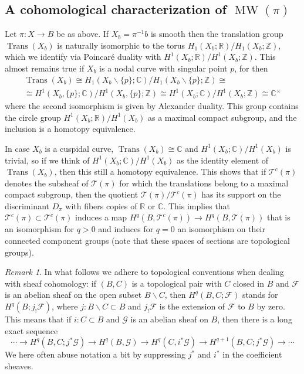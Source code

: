 \documentclass[10pt,letterpaper]{amsart}
\numberwithin{equation}{section}
\def\CC{{\mathbb C}}
\def\RR{{\mathbb R}}
\def\ZZ{{\mathbb Z}}
\def\ssm{\smallsetminus}
\def\Fscr{{\mathscr F}}
\def\Gscr{{\mathscr G}}
\def\Tscr{{\mathscr T}}
\newcommand\MW{\operatorname{MW}}
\newcommand\Trans{\operatorname{Trans}}
\theoremstyle{remark}
\newtheorem{remark}[theorem]{Remark}
\begin{document}
\subsection{A cohomological characterization of $\MW(\pi)$} 
Let $\pi: X\to B$ be as above. 
If $X_b=\pi^{-1}b$ is smooth then the translation group  $\Trans (X_b)$ is naturally isomorphic to 
the torus $H_1(X_b; \RR)/H_1(X_b; \ZZ)$, which we identify via Poincar\'e duality with 
$H^1(X_b; \RR)/H^1(X_b; \ZZ)$. This almost remains true if $X_b$ is a nodal curve with singular point $p$, for then 
\begin{multline*}
\Trans (X_b)\cong H_1(X_b\ssm \{p\}; \CC)/H_1(X_b\ssm \{p\}; \ZZ)\cong\\\cong  
H^1(X_b,\{p\}; \CC)/H^1(X_b, \{p\}; \ZZ) \cong H^1(X_b; \CC)/H^1(X_b; \ZZ)\cong\CC^\times
\end{multline*}
where the second isomorphism is given by Alexander duality.  This group contains the circle group $H^1(X_b; \RR)/H^1(X_b)$ as a maximal compact subgroup, and the inclusion is a homotopy equivalence. 

In case $X_b$ is a cuspidal curve, $\Trans (X_b)\cong \CC$ and $H^1(X_b; \CC)/H^1(X_b)$ is trivial, so if we think of $H^1(X_b; \CC)/H^1(X_b)$ as the identity element of $\Trans(X_b)$, then this still a homotopy equivalence.
This shows that if  $ \Tscr^c(\pi)$ denotes
the subsheaf  of  $\Tscr(\pi)$ for which the translations belong to a maximal compact subgroup, then  the quotient $\Tscr(\pi)/\Tscr^c(\pi)$ has its support on the discriminant $D_\pi$ with fibers copies of $\RR$ or $\CC$. This implies that $\Tscr^c(\pi)\subset \Tscr^c(\pi)$ induces a map $H^q(B,\Tscr^c(\pi))\to H^q(B,\Tscr(\pi))$ that is an  isomorphism for $q>0$  and  
induces for $q=0$ an isomorphism on  their  connected component groups (note that these spaces of sections are topological groups).

\begin{remark}\label{rem:sheafconvention}
In what follows we adhere to topological conventions when dealing with sheaf cohomology:  if  $(B, C)$ is a topological pair   with $C$ closed in $B$ and $\Fscr$ is an abelian  sheaf on the open subset $B\ssm C$, then $H^q(B,C; \Fscr)$  stands for $H^q(B; j_!\Fscr)$, where $j:B\ssm C\subset B$ and $ j_!\Fscr$ is the extension of $\Fscr$ to $B$ by zero. This means that if $i: C\subset B$ and 
$\Gscr$ is an abelian sheaf on $B$, then there is a long  exact sequence 
\[
\cdots\to  H^{q}(B,C; j^*\Gscr)\to H^q(B, \Gscr)\to H^q(C, i^*\Gscr)\to H^{q+1}(B,C; j^*\Gscr)\to \cdots 
\]
We here often abuse notation a bit by suppressing $j^*$ and $i^*$ in the coefficient sheaves.
\end{remark}
\end{document}

